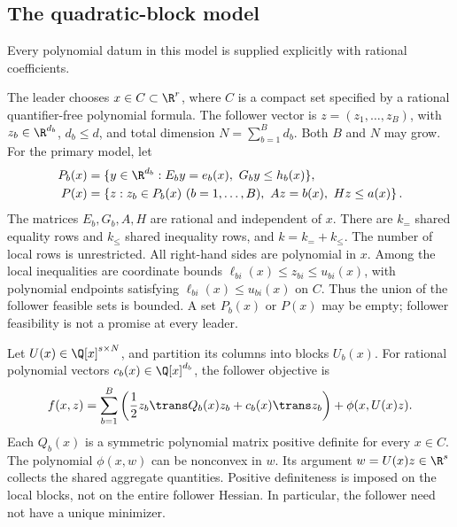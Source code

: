 \subsection{The quadratic-block model}\label{subsec:model}

Every polynomial datum in this model is supplied explicitly with rational
coefficients.

The leader chooses $x\in C\subset\R^r$, where $C$ is a compact set
specified by a rational quantifier-free polynomial formula. The follower
vector is $z=(z_1,\ldots,z_B)$, with $z_b\in\R^{d_b}$,
$d_b\le d$, and total dimension $N=\sum_{b=1}^B d_b$. Both $B$ and $N$
may grow. For the primary model, let
\begin{align}
 P_b(x)&=\{y\in\R^{d_b}:E_b y=e_b(x),\ G_b y\le h_b(x)\},
 \label{eq:local-polytope}\\
 P(x)&=\left\{z:z_b\in P_b(x)\ (b=1,\ldots,B),\
                     Az=b(x),\ Hz\le a(x)\right\}.
 \label{eq:follower-polytope}
\end{align}
The matrices $E_b,G_b,A,H$ are rational and independent of $x$.
There are $k_{=}$ shared equality rows and $k_{\le}$ shared inequality
rows, and $k=k_=+k_{\le}$. The number of local rows is unrestricted.
All right-hand sides are polynomial in $x$. Among the local inequalities
are coordinate bounds
$\ell_{bi}(x)\le z_{bi}\le u_{bi}(x)$, with polynomial endpoints
satisfying $\ell_{bi}(x)\le u_{bi}(x)$ on $C$.
Thus the union of the follower feasible sets is bounded.
A set $P_b(x)$ or $P(x)$ may be empty; follower feasibility is not a
promise at every leader.

Let $U(x)\in\Q[x]^{s\times N}$, and partition its columns into blocks
$U_b(x)$. For rational polynomial vectors $c_b(x)\in\Q[x]^{d_b}$,
the follower objective is
\begin{equation}\label{eq:quadratic-objective}
 f(x,z)=\sum_{b=1}^B\left(\frac12 z_b\trans Q_b(x)z_b+
                c_b(x)\trans z_b\right)+\phi(x,U(x)z).
\end{equation}
Each $Q_b(x)$ is a symmetric polynomial matrix positive definite for
every $x\in C$. The polynomial $\phi(x,w)$ can be nonconvex in $w$.
Its argument $w=U(x)z\in\R^s$ collects the shared aggregate quantities.
Positive definiteness is imposed on the local blocks, not on the entire
follower Hessian. In particular, the follower need not have a unique
minimizer.

